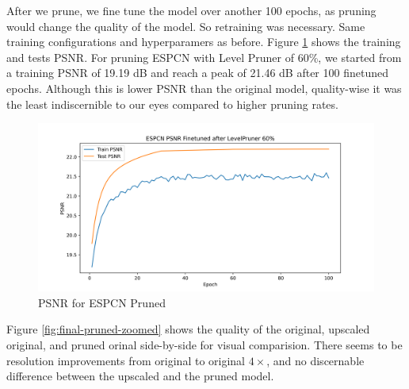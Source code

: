 \documentclass{article}
\begin{document}
After we prune, we fine tune the model over another 100 epochs, as pruning would change the quality of the model. So retraining was necessary. Same training configurations and hyperparamers as before.  Figure \ref{fig:psnr-pruned} shows the training and tests PSNR. For pruning ESPCN with Level Pruner of 60\%, we started from a training PSNR of 19.19 dB and reach a peak of 21.46 dB after 100 finetuned epochs. Although this is lower PSNR than the original model, quality-wise it was the least indiscernible to our eyes compared to higher pruning rates.

\begin{figure}
	\centerline{\includegraphics[width=6in]{../final/figures/SuperResolutionTwitter_PSNR_pruned.png}}
	\caption{PSNR for ESPCN Pruned}
	\label{fig:psnr-pruned}
\end{figure}


Figure \ref{fig:final-pruned-zoomed} shows the quality of the original, upscaled original, and pruned orinal side-by-side for visual comparision. There seems to be resolution improvements from original to original $4\times$, and no discernable difference between the upscaled and the pruned model.
\end{document}

